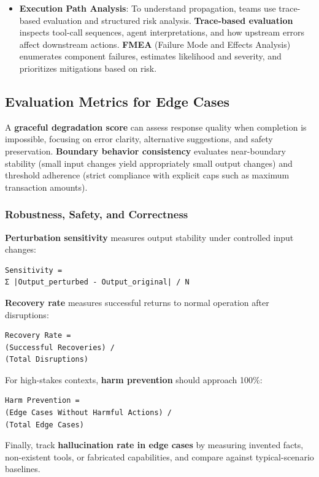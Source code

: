 \begin{TNtwocol}
\begin{itemize}
\item\textbf{{Execution Path Analysis}}: To understand propagation, teams use trace-based evaluation and structured risk analysis. \textbf{Trace-based evaluation} inspects tool-call sequences, agent interpretations, and how upstream errors affect downstream actions. \textbf{FMEA} (Failure Mode and Effects Analysis) enumerates component failures, estimates likelihood and severity, and prioritizes mitigations based on risk.
\end{itemize}
\subsection*{Evaluation Metrics for Edge Cases}

A \textbf{graceful degradation score} can assess response quality when completion is impossible, focusing on error clarity, alternative suggestions, and safety preservation. \textbf{Boundary behavior consistency} evaluates near-boundary stability (small input changes yield appropriately small output changes) and threshold adherence (strict compliance with explicit caps such as maximum transaction amounts).

\subsubsection*{Robustness, Safety, and Correctness}
\textbf{Perturbation sensitivity} measures output stability under controlled input changes:
\begin{verbatim}
Sensitivity = 
Σ |Output_perturbed - Output_original| / N
\end{verbatim}
\textbf{Recovery rate} measures successful returns to normal operation after disruptions:
\begin{verbatim}
Recovery Rate = 
(Successful Recoveries) / 
(Total Disruptions)
\end{verbatim}
For high-stakes contexts, \textbf{harm prevention} should approach 100\%:
\begin{verbatim}
Harm Prevention = 
(Edge Cases Without Harmful Actions) / 
(Total Edge Cases)
\end{verbatim}
Finally, track \textbf{hallucination rate in edge cases} by measuring invented facts, non-existent tools, or fabricated capabilities, and compare against typical-scenario baselines.


\end{TNtwocol}
